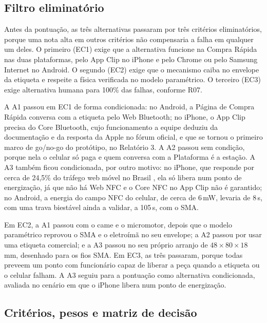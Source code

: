 \subsection{Filtro eliminatório}

Antes da pontuação, as três alternativas passaram por três critérios eliminatórios, porque uma nota alta em outros critérios não compensaria a falha em qualquer um deles. O primeiro (EC1) exige que a alternativa funcione na Compra Rápida nas duas plataformas, pelo App Clip no iPhone e pelo Chrome ou pelo Samsung Internet no Android. O segundo (EC2) exige que o mecanismo caiba no envelope da etiqueta e respeite a física verificada no modelo paramétrico. O terceiro (EC3) exige alternativa humana para 100\% das falhas, conforme R07.

A A1 passou em EC1 de forma condicionada: no Android, a Página de Compra Rápida conversa com a etiqueta pelo Web Bluetooth; no iPhone, o App Clip precisa do Core Bluetooth, cujo funcionamento a equipe deduziu da documentação e da resposta da Apple no fórum oficial, e que se tornou o primeiro marco de go/no-go do protótipo, no Relatório 3. A A2 passou sem condição, porque nela o celular só paga e quem conversa com a Plataforma é a estação. A A3 também ficou condicionada, por outro motivo: no iPhone, que responde por cerca de 24,5\% do tráfego web móvel no Brasil \cite{statcounter2026so}, ela só libera num ponto de energização, já que não há Web NFC e o Core NFC no App Clip não é garantido; no Android, a energia do campo NFC do celular, de cerca de 6\,mW, levaria de 8\,s, com uma trava biestável ainda a validar, a 105\,s, com o SMA.

Em EC2, a A1 passou com o came e o micromotor, depois que o modelo paramétrico reprovou o SMA e o eletroímã no seu envelope; a A2 passou por usar uma etiqueta comercial; e a A3 passou no seu próprio arranjo de $48 \times 80 \times 18$\,mm, desenhado para os fios SMA. Em EC3, as três passaram, porque todas preveem um ponto com funcionário capaz de liberar a peça quando a etiqueta ou o celular falham. A A3 seguiu para a pontuação como alternativa condicionada, avaliada no cenário em que o iPhone libera num ponto de energização.

\subsection{Critérios, pesos e matriz de decisão}

